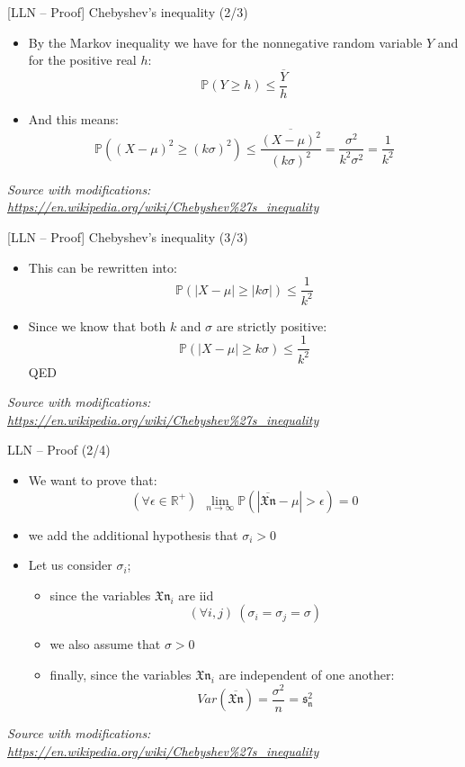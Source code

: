 \documentclass{beamer}
\begin{document}
\begin{frame}
{\centerline{[LLN -- Proof] Chebyshev's inequality (2/3)}}

\begin{itemize}
\item By the Markov inequality we have for the nonnegative random variable $Y$ and for the positive real $h$:
$$\mathbb{P} ( Y  \geq h) \leq \frac{\overline{Y}}{h}$$
\item And this means:
$$\mathbb{P} ( (X - \mu)^2  \geq {(k\sigma)}^2) \leq \frac{\overline{(X - \mu)^2}}{{(k\sigma)}^2}= \frac{\sigma^2}{k^2\sigma^2}= \frac{1}{k^2}$$


\end{itemize}


\textit{\small
Source with modifications: \url{https://en.wikipedia.org/wiki/Chebyshev\%27s_inequality}}
\end{frame}


\begin{frame}
{\centerline{[LLN -- Proof] Chebyshev's inequality (3/3)}}

\begin{itemize}
\item This can be rewritten into:
$$\mathbb{P} ( |X - \mu|  \geq |k\sigma|) \leq  \frac{1}{k^2}$$
\item Since we know that both $k$ and $\sigma$ are strictly positive:
$$\mathbb{P} ( |X - \mu|  \geq k\sigma) \leq  \frac{1}{k^2}$$
QED


\end{itemize}


\textit{\small
Source with modifications: \url{https://en.wikipedia.org/wiki/Chebyshev\%27s_inequality}}
\end{frame}

\begin{frame}
{\centerline{LLN -- Proof (2/4)}}

\begin{itemize}
\item We want to prove that:
$$(\forall \epsilon \in \mathbb{R}^+) ~~ \lim_{n \to \infty} \mathbb{P} ( | \overline{\mathfrak{Xn}} - \mu |  > \epsilon ) = 0$$
\item we add the additional hypothesis that $\sigma_i > 0$
\item Let us consider $\sigma_i$; 
\begin{itemize}
\item since the variables $\mathfrak{Xn}_i$ are iid
$$(\forall i, j) ~ (\sigma_i = \sigma_j = \sigma) $$
\item we also assume that $\sigma > 0$
\item finally, since the variables $\mathfrak{Xn}_i$ are independent of one another:
$$Var(\overline{\mathfrak{Xn}}) = \frac{\sigma^2}{n} = \mathfrak{s_n^2}$$
\end{itemize}
\end{itemize}


\textit{\small
Source with modifications: \url{https://en.wikipedia.org/wiki/Chebyshev\%27s_inequality}}
\end{frame}
\end{document}
